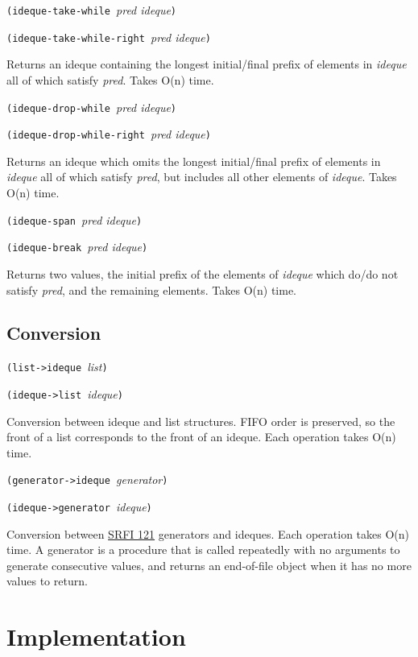 \texttt{(ideque-take-while\ }\emph{pred ideque}\texttt{)}

\texttt{(ideque-take-while-right\ }\emph{pred ideque}\texttt{)}

Returns an ideque containing the longest initial/final prefix of
elements in \emph{ideque} all of which satisfy \emph{pred}. Takes O(n)
time.

\texttt{(ideque-drop-while\ }\emph{pred ideque}\texttt{)}

\texttt{(ideque-drop-while-right\ }\emph{pred ideque}\texttt{)}

Returns an ideque which omits the longest initial/final prefix of
elements in \emph{ideque} all of which satisfy \emph{pred}, but includes
all other elements of \emph{ideque}. Takes O(n) time.

\texttt{(ideque-span\ }\emph{pred ideque}\texttt{)}

\texttt{(ideque-break\ }\emph{pred ideque}\texttt{)}

Returns two values, the initial prefix of the elements of \emph{ideque}
which do/do not satisfy \emph{pred}, and the remaining elements. Takes
O(n) time.

\hypertarget{Conversion}{\subsection{Conversion}\label{Conversion}}

\texttt{(list-\textgreater{}ideque\ }\emph{list}\texttt{)}

\texttt{(ideque-\textgreater{}list\ }\emph{ideque}\texttt{)}

Conversion between ideque and list structures. FIFO order is preserved,
so the front of a list corresponds to the front of an ideque. Each
operation takes O(n) time.

\texttt{(generator-\textgreater{}ideque\ }\emph{generator}\texttt{)}

\texttt{(ideque-\textgreater{}generator\ }\emph{ideque}\texttt{)}

Conversion between
\href{http://srfi.schemers.org/srfi-121/srfi-121.html}{SRFI 121}
generators and ideques. Each operation takes O(n) time. A generator is a
procedure that is called repeatedly with no arguments to generate
consecutive values, and returns an end-of-file object when it has no
more values to return.

\section{Implementation}\label{implementation}

